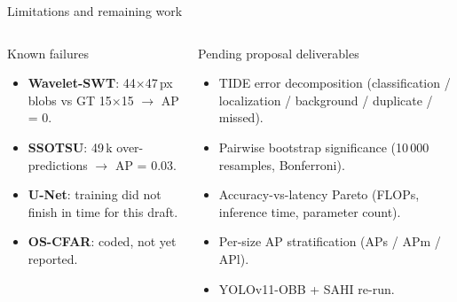 \documentclass[aspectratio=169,10pt]{beamer}
\newcommand{\hl}[1]{\textcolor{garnet}{\textbf{#1}}}
\begin{document}
\begin{frame}{Limitations and remaining work}
  \begin{columns}[T,onlytextwidth]
      \begin{block}{Known failures}
        \small
        \begin{itemize}\setlength\itemsep{0.25em}
          \item \hl{Wavelet-SWT}: 44$\times$47\,px blobs vs GT 15$\times$15 $\rightarrow$ AP = 0.
          \item \hl{SSOTSU}: 49\,k over-predictions $\rightarrow$ AP = 0.03.
          \item \hl{U-Net}: training did not finish in time for this draft.
          \item \hl{OS-CFAR}: coded, not yet reported.
        \end{itemize}
      \end{block}
      \begin{block}{Pending proposal deliverables}
        \small
        \begin{itemize}\setlength\itemsep{0.25em}
          \item TIDE error decomposition (classification / localization / background / duplicate / missed).
          \item Pairwise bootstrap significance (10\,000 resamples, Bonferroni).
          \item Accuracy-vs-latency Pareto (FLOPs, inference time, parameter count).
          \item Per-size AP stratification (APs / APm / APl).
          \item YOLOv11-OBB + SAHI re-run.
        \end{itemize}
      \end{block}
  \end{columns}
\end{frame}
\end{document}
